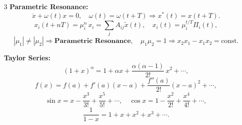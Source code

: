 \documentclass[1pt]{article}
\begin{document}
\begin{multicols}{3}
\textbf{Parametric Resonance:}
\[
\ddot{x}+\omega(t)x=0,\quad \omega(t)=\omega(t+T)\Rightarrow x^*(t)=x(t+T).
\]
\[
x_i(t+nT)=\mu_i^n\,x_i=\sum_j A_{ij}\tilde{x}(t),\quad
x_i(t)=\mu_i^{t/T}\Pi_i(t),
\]
\[
|\mu_1|\neq|\mu_2|\Rightarrow\textbf{Parametric Resonance},\quad
\mu_1\mu_2=1\Rightarrow x_2x_1-x_1x_2=\text{const}.
\]

\textbf{Taylor Series:}
\[
(1+x)^\alpha=1+\alpha x+\frac{\alpha(\alpha-1)}{2!}\,x^2+\cdots,
\]
\[
f(x)=f(a)+f'(a)(x-a)+\frac{f''(a)}{2!}(x-a)^2+\cdots,
\]
\[
\sin x=x-\frac{x^3}{3!}+\frac{x^5}{5!}+\cdots,\quad
\cos x=1-\frac{x^2}{2!}+\frac{x^4}{4!}+\cdots,
\]
\[
\frac{1}{1-x}=1+x+x^2+x^3+\cdots.
\]

\end{multicols}
\end{document}

